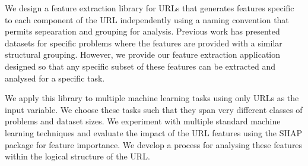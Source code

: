 \documentclass{aircc}
\begin{document}
\begin{table}
\caption{URL Components and Feature Information}
\label{tab:components}
\end{table}

We design a feature extraction library for URLs that generates features specific to each component of the
URL independently using a naming convention that permits sepearation and grouping for analysis.
Previous work has presented datasets for specific problems where the features
are provided with a similar structural grouping\cite{Vrban2020}. However, we provide our feature extraction
application designed so that any specific subset of these features can be extracted and analysed 
for a specific task.

We apply this library to multiple machine learning tasks using only URLs as the input variable. We choose
these tasks such that they span very different classes of problems and dataset sizes. 
We experiment with multiple standard machine learning techniques and evaluate
the impact of the URL features using the SHAP package for feature importance. We develop a process
for analysing these features within the logical structure of the URL.
\end{document}
